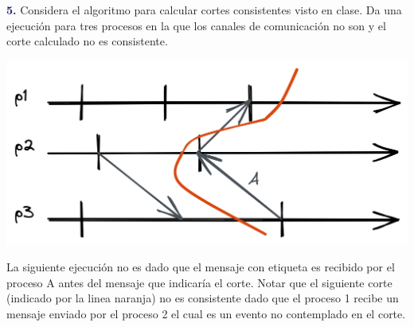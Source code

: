 \newpage
\textbf{\textcolor{MidnightBlue}{5.}}
Considera el algoritmo para calcular cortes consistentes visto en clase. Da una ejecución
para tres procesos en la que los canales de comunicación no son  y el corte
calculado no es consistente.


\begin{center}
    \includegraphics[width=\textwidth]{ejercicio5.png}
\end{center}

La siguiente ejecución no es  dado que el mensaje con etiqueta  es recibido por el proceso A antes del mensaje que indicaría el corte. Notar que el siguiente corte (indicado por la linea naranja) no es consistente dado que el proceso 1 recibe un mensaje enviado por el proceso 2 el cual es un evento no contemplado en el corte. 